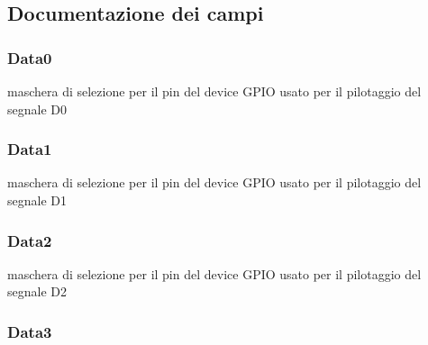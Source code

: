 \subsection{Documentazione dei campi}
\hypertarget{struct_h_d44780___l_c_d__t_a1f035dad73cbfdf86503edc70141696b}{
\subsubsection[{Data0}]{ Data0}}\label{struct_h_d44780___l_c_d__t_a1f035dad73cbfdf86503edc70141696b}
maschera di selezione per il pin del device G\+P\+I\+O usato per il pilotaggio del segnale D0 \hypertarget{struct_h_d44780___l_c_d__t_a3f02fac6148faca9f183a786e0cf07d8}{
\subsubsection[{Data1}]{ Data1}}\label{struct_h_d44780___l_c_d__t_a3f02fac6148faca9f183a786e0cf07d8}
maschera di selezione per il pin del device G\+P\+I\+O usato per il pilotaggio del segnale D1 \hypertarget{struct_h_d44780___l_c_d__t_af0a0822c09b4802e36ac8044447de80a}{
\subsubsection[{Data2}]{ Data2}}\label{struct_h_d44780___l_c_d__t_af0a0822c09b4802e36ac8044447de80a}
maschera di selezione per il pin del device G\+P\+I\+O usato per il pilotaggio del segnale D2 \hypertarget{struct_h_d44780___l_c_d__t_a84205eb8dd4646c5e83dec2d77e78c39}{
\subsubsection[{Data3}]{ Data3}}\label{struct_h_d44780___l_c_d__t_a84205eb8dd4646c5e83dec2d77e78c39}
